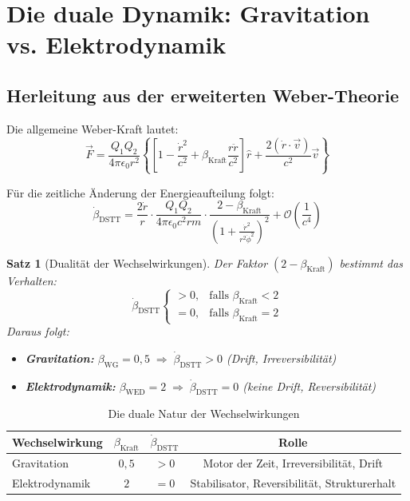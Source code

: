 \documentclass[12pt,a4paper]{article}
\newtheorem{satz}{Satz}
\begin{document}
\section{Die duale Dynamik: Gravitation vs. Elektrodynamik}

\subsection{Herleitung aus der erweiterten Weber-Theorie}

Die allgemeine Weber-Kraft lautet:
\begin{equation}
\vec{F} = \frac{Q_1Q_2}{4\pi\epsilon_0 r^2} \left\{ \left[ 1 - \frac{\dot{r}^2}{c^2} + \beta_{\text{Kraft}} \frac{r\ddot{r}}{c^2} \right] \hat{r} + \frac{2(\dot{r} \cdot \vec{v})}{c^2} \vec{v} \right\}
\end{equation}

Für die zeitliche Änderung der Energieaufteilung folgt:
\begin{equation}
\dot{\beta}_{\text{DSTT}} = \frac{2\dot{r}}{r} \cdot \frac{Q_1Q_2}{4\pi\epsilon_0 c^2 r m} \cdot \frac{2 - \beta_{\text{Kraft}}}{\left(1 + \frac{\dot{r}^2}{r^2\dot{\phi}^2}\right)^2} + \mathcal{O}\left(\frac{1}{c^4}\right)
\end{equation}

\begin{satz}[Dualität der Wechselwirkungen]
Der Faktor $(2 - \beta_{\text{Kraft}})$ bestimmt das Verhalten:
\begin{equation}
\boxed{\dot{\beta}_{\text{DSTT}} \begin{cases}
> 0, & \text{falls } \beta_{\text{Kraft}} < 2 \\
= 0, & \text{falls } \beta_{\text{Kraft}} = 2
\end{cases}}
\end{equation}
Daraus folgt:
\begin{itemize}
    \item \textbf{Gravitation:} $\beta_{\text{WG}} = 0,5 \;\Rightarrow\; \dot{\beta}_{\text{DSTT}} > 0$ (Drift, Irreversibilität)
    \item \textbf{Elektrodynamik:} $\beta_{\text{WED}} = 2 \;\Rightarrow\; \dot{\beta}_{\text{DSTT}} = 0$ (keine Drift, Reversibilität)
\end{itemize}
\end{satz}

\begin{table}[ht]
\centering
\caption{Die duale Natur der Wechselwirkungen}
\begin{tabular}{|l|c|c|c|}
\hline
\textbf{Wechselwirkung} & $\beta_{\text{Kraft}}$ & $\dot{\beta}_{\text{DSTT}}$ & \textbf{Rolle} \\ \hline
Gravitation & $0,5$ & $> 0$ & Motor der Zeit, Irreversibilität, Drift \\ \hline
Elektrodynamik & $2$ & $= 0$ & Stabilisator, Reversibilität, Strukturerhalt \\ \hline
\end{tabular}
\end{table}
\end{document}
